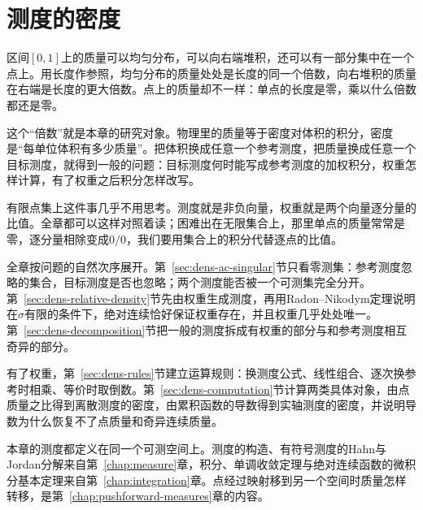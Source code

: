 \chapter{测度的密度}
\label{chap:measure-densities}
\label{chap:densities-change-of-measure}

区间$[0,1]$上的质量可以均匀分布，可以向右端堆积，还可以有一部分集中在一个点上。用长度作参照，均匀分布的质量处处是长度的同一个倍数，向右堆积的质量在右端是长度的更大倍数。点上的质量却不一样：单点的长度是零，乘以什么倍数都还是零。

这个“倍数”就是本章的研究对象。物理里的质量等于密度对体积的积分，密度是“每单位体积有多少质量”。把体积换成任意一个参考测度，把质量换成任意一个目标测度，就得到一般的问题：目标测度何时能写成参考测度的加权积分，权重怎样计算，有了权重之后积分怎样改写。

有限点集上这件事几乎不用思考。测度就是非负向量，权重就是两个向量逐分量的比值。全章都可以这样对照着读；困难出在无限集合上，那里单点的质量常常是零，逐分量相除变成$0/0$，我们要用集合上的积分代替逐点的比值。

全章按问题的自然次序展开。第~\ref{sec:dens-ac-singular}节只看零测集：参考测度忽略的集合，目标测度是否也忽略；两个测度能否被一个可测集完全分开。第~\ref{sec:dens-relative-density}节先由权重生成测度，再用Radon–Nikodym定理说明在$\sigma$有限的条件下，绝对连续恰好保证权重存在，并且权重几乎处处唯一。第~\ref{sec:dens-decomposition}节把一般的测度拆成有权重的部分与和参考测度相互奇异的部分。

有了权重，第~\ref{sec:dens-rules}节建立运算规则：换测度公式、线性组合、逐次换参考时相乘、等价时取倒数。第~\ref{sec:dens-computation}节计算两类具体对象，由点质量之比得到离散测度的密度，由累积函数的导数得到实轴测度的密度，并说明导数为什么恢复不了点质量和奇异连续质量。

本章的测度都定义在同一个可测空间上。测度的构造、有符号测度的Hahn与Jordan分解来自第~\ref{chap:measure}章，积分、单调收敛定理与绝对连续函数的微积分基本定理来自第~\ref{chap:integration}章。点经过映射移到另一个空间时质量怎样转移，是第~\ref{chap:pushforward-measures}章的内容。







